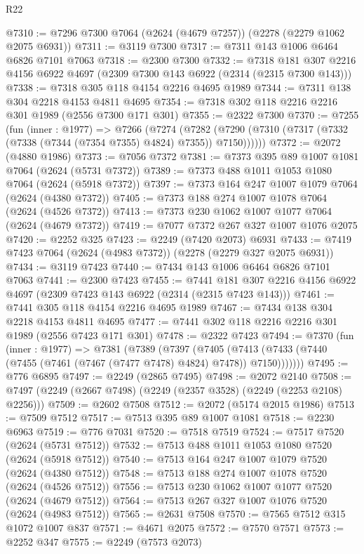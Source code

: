 \begin{lexlean}{R22}
\begin{coremodule}
@7310 := @7296 @7300 @7064 (@2624 (@4679 @7257)) (@2278 (@2279 @1062 @2075 @6931))
@7311 := @3119 @7300
@7317 := @7311 @143 @1006 @6464 @6826 @7101 @7063
@7318 := @2300 @7300
@7332 := @7318 @181 @307 @2216 @4156 @6922 @4697 (@2309 @7300 @143 @6922 (@2314 (@2315 @7300 @143)))
@7338 := @7318 @305 @118 @4154 @2216 @4695 @1989
@7344 := @7311 @138 @304 @2218 @4153 @4811 @4695
@7354 := @7318 @302 @118 @2216 @2216 @301 @1989 (@2556 @7300 @171 @301)
@7355 := @2322 @7300
@7370 := @7255
    (fun (inner : @1977) =>
    @7266
      (@7274
        (@7282 (@7290 (@7310 (@7317 (@7332 (@7338 (@7344 (@7354 @7355) @4824) @7355)) @7150))))))
@7372 := @2072 (@4880 @1986)
@7373 := @7056 @7372
@7381 := @7373 @395 @89 @1007 @1081 @7064 (@2624 (@5731 @7372))
@7389 := @7373 @488 @1011 @1053 @1080 @7064 (@2624 (@5918 @7372))
@7397 := @7373 @164 @247 @1007 @1079 @7064 (@2624 (@4380 @7372))
@7405 := @7373 @188 @274 @1007 @1078 @7064 (@2624 (@4526 @7372))
@7413 := @7373 @230 @1062 @1007 @1077 @7064 (@2624 (@4679 @7372))
@7419 := @7077 @7372 @267 @327 @1007 @1076 @2075
@7420 := @2252 @325
@7423 := @2249 (@7420 @2073) @6931
@7433 := @7419 @7423 @7064 (@2624 (@4983 @7372)) (@2278 (@2279 @327 @2075 @6931))
@7434 := @3119 @7423
@7440 := @7434 @143 @1006 @6464 @6826 @7101 @7063
@7441 := @2300 @7423
@7455 := @7441 @181 @307 @2216 @4156 @6922 @4697 (@2309 @7423 @143 @6922 (@2314 (@2315 @7423 @143)))
@7461 := @7441 @305 @118 @4154 @2216 @4695 @1989
@7467 := @7434 @138 @304 @2218 @4153 @4811 @4695
@7477 := @7441 @302 @118 @2216 @2216 @301 @1989 (@2556 @7423 @171 @301)
@7478 := @2322 @7423
@7494 := @7370
    (fun (inner : @1977) =>
    @7381
      (@7389
        (@7397
          (@7405 (@7413 (@7433 (@7440 (@7455 (@7461 (@7467 (@7477 @7478) @4824) @7478)) @7150)))))))
@7495 := @776 @6895
@7497 := @2249 (@2865 @7495)
@7498 := @2072 @2140
@7508 := @7497 (@2249 (@2667 @7498) (@2249 (@2357 @3528) (@2249 (@2253 @2108) @2256)))
@7509 := @2602 @7508
@7512 := @2072 (@5174 @2015 @1986)
@7513 := @7509 @7512
@7517 := @7513 @395 @89 @1007 @1081
@7518 := @2230 @6963
@7519 := @776 @7031
@7520 := @7518 @7519
@7524 := @7517 @7520 (@2624 (@5731 @7512))
@7532 := @7513 @488 @1011 @1053 @1080 @7520 (@2624 (@5918 @7512))
@7540 := @7513 @164 @247 @1007 @1079 @7520 (@2624 (@4380 @7512))
@7548 := @7513 @188 @274 @1007 @1078 @7520 (@2624 (@4526 @7512))
@7556 := @7513 @230 @1062 @1007 @1077 @7520 (@2624 (@4679 @7512))
@7564 := @7513 @267 @327 @1007 @1076 @7520 (@2624 (@4983 @7512))
@7565 := @2631 @7508
@7570 := @7565 @7512 @315 @1072 @1007 @837
@7571 := @4671 @2075
@7572 := @7570 @7571
@7573 := @2252 @347
@7575 := @2249 (@7573 @2073)

\end{coremodule}
\end{lexlean}
